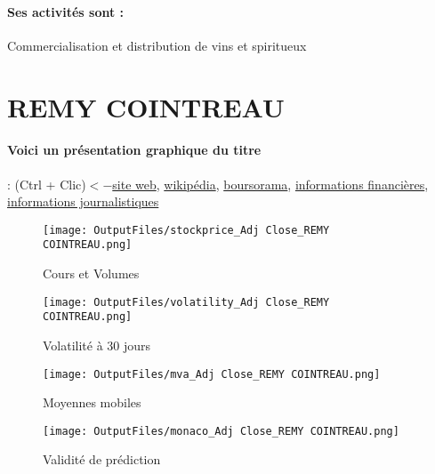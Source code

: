 \documentclass[11pt,a4paper]{report}%
\begin{document}
\paragraph{Ses activités sont : } Commercialisation et distribution de vins et spiritueux  
    
    \newpage

\section{REMY COINTREAU}

\paragraph{Voici un présentation graphique du titre} : (Ctrl + Clic)$<-$\href{https://www.remy-cointreau.com/fr/finance/}{site web}, \href{https://fr.wikipedia.org/wiki/R%C3%A9my_Cointreau}{wikipédia}, \href{https://www.boursorama.com/cours/1rPRCO}{boursorama}, \href{https://www.qwant.com/?q=site:https:%2f%2fwww.easybourse.com%2faction-societe%2fREMY-COINTREAU&t=web&client=ext-firefox-hp}{informations financières}, \href{https://bourse.lerevenu.com/cours-de-bourse/fiche-valeur-synthese/REMY-COINTREAU/RCO-FR}{informations journalistiques}
\begin{figure}[!htb]
   \begin{minipage}{0.5\textwidth}
     \centering
     \texttt{[image: OutputFiles/stockprice\_Adj Close\_REMY COINTREAU.png]}
     \caption{Cours et Volumes}\label{Fig:price_REMY COINTREAU}
   \end{minipage}\hfill
   \begin{minipage}{0.5\textwidth}
     \centering
     \texttt{[image: OutputFiles/volatility\_Adj Close\_REMY COINTREAU.png]}
     \caption{Volatilité à 30 jours}\label{Fig:volat_REMY COINTREAU}
   \end{minipage}
\end{figure}
\begin{figure}[!htb]
   \begin{minipage}{0.5\textwidth}
     \centering
     \texttt{[image: OutputFiles/mva\_Adj Close\_REMY COINTREAU.png]}
     \caption{Moyennes mobiles}\label{Fig:mva_REMY COINTREAU}
   \end{minipage}\hfill
   \begin{minipage}{0.5\textwidth}
     \centering
     \texttt{[image: OutputFiles/monaco\_Adj Close\_REMY COINTREAU.png]}
     \caption{Validité de prédiction}\label{Fig:prediction_REMY COINTREAU}
   \end{minipage}
\end{figure}
\end{document}
